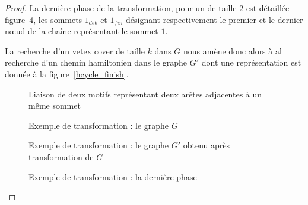 \begin{proof}
    La dernière phase de la transformation, pour un \vcover de taille $2$ est détaillée
    figure~\ref{hcycle_last}, les sommets $1_{deb}$ et $1_{fin}$ désignant respectivement le premier
    et le dernier n\oe ud de la chaîne représentant le sommet $1$. 

    La recherche d'un vetex cover de taille $k$ dans $G$ nous amène donc alors à al recherche d'un
    chemin hamiltonien dans le graphe $G'$ dont une représentation est donnée à la
    figure~\ref{hcycle_finish}.

    \begin{figure}
        \begin{center}
            \begin{tikzpicture}[scale=0.8, every node/.style={transform shape}]
                
            \end{tikzpicture}
            \caption{Liaison de deux motifs représentant deux arêtes adjacentes à un même sommet}
            \label{hcycle_couple}
        \end{center}
    \end{figure}

    \begin{figure}
        \begin{center}
            \begin{tikzpicture}
                
            \end{tikzpicture}
            \caption{Exemple de transformation : le graphe $G$}
            \label{hcycle_graphe_g}
        \end{center}
    \end{figure}

    \begin{figure}
        \begin{center}
            \begin{tikzpicture}[scale=0.6, every node/.style={transform shape}, tmp/.style={inner
                    sep=0mm, node distance=3mm}]
                
            \end{tikzpicture}
            \caption{Exemple de transformation : le graphe $G'$ obtenu après transformation de $G$}
            \label{hcycle_graphe_gprime}
        \end{center}
    \end{figure}

    \begin{figure}
        \begin{center}
            \begin{tikzpicture}[scale=2, tmp/.style={vertex, minimum size=10mm}]
                
            \end{tikzpicture}
            \caption{Exemple de transformation : la dernière phase}
            \label{hcycle_last}
        \end{center}
    \end{figure}


\end{proof}
